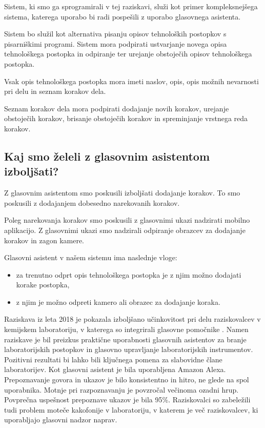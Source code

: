 \documentclass[a4paper, 12pt]{book}
\begin{document}
	Sistem, ki smo ga sprogramirali v tej raziskavi, služi kot primer kompleksnejšega sistema, katerega uporabo bi radi pospešili z uporabo glasovnega asistenta.

Sistem bo služil kot alternativa pisanju opisov tehnoloških postopkov s pisarniškimi programi.
Sistem mora podpirati ustvarjanje novega opisa tehnološkega postopka in odpiranje ter urejanje obstoječih opisov tehnološkega postopka.

Vsak opis tehnološkega postopka mora imeti naslov, opis, opis možnih nevarnosti pri delu in seznam korakov dela.

Seznam korakov dela mora podpirati dodajanje novih korakov, urejanje obstoječih korakov, brisanje obstoječih korakov in spreminjanje vrstnega reda korakov.

\subsection{Kaj smo želeli z glasovnim asistentom izboljšati?}

Z glasovnim asistentom smo poskusili izboljšati dodajanje korakov.
To smo poskusili z dodajanjem dobesedno narekovanih korakov.

Poleg narekovanja korakov smo poskusili z glasovnimi ukazi nadzirati mobilno aplikacijo.
Z glasovnimi ukazi smo nadzirali odpiranje obrazcev za dodajanje korakov in zagon kamere.

\bigbreak 
Glasovni asistent v našem sistemu ima naslednje vloge:
\begin{itemize}
	\item za trenutno odprt opis tehnološkega postopka je z njim možno dodajati korake postopka,
	\item z njim je možno odpreti kamero ali obrazec za dodajanje koraka.
\end{itemize}

Raziskava iz leta 2018 je pokazala izboljšano učinkovitost pri delu raziskovalcev v kemijskem laboratoriju, v katerega so integrirali glasovne pomočnike \cite{austerjost2018introducing}.
Namen raziskave je bil preizkus praktične uporabnosti glasovnih asistentov za branje laboratorijskih postopkov in glasovno upravljanje laboratorijskih instrumentov.
Pozitivni rezultati bi lahko bili ključnega pomena za slabovidne člane laboratorijev.
Kot glasovni asistent je bila uporabljena Amazon Alexa.
Prepoznavanje govora in ukazov je bilo konsistentno in hitro, ne glede na spol uporabnika.
Motnje pri razpoznavanju je povzročal večinoma ozadni hrup.
Povprečna uspešnost prepoznave ukazov je bila 95\%.
Raziskovalci so zabeležili tudi problem moteče kakofonije v laboratoriju, v katerem je več raziskovalcev, ki uporabljajo glasovni nadzor naprav.
\end{document}
